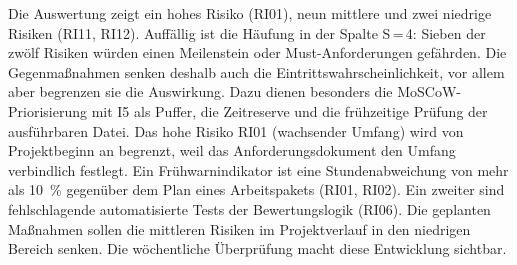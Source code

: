 Die Auswertung zeigt ein hohes Risiko (RI01), neun mittlere und zwei niedrige Risiken (RI11, RI12). Auffällig ist die Häufung in der Spalte S\,=\,4: Sieben der zwölf Risiken würden einen Meilenstein oder Must-Anforderungen gefährden. Die Gegenmaßnahmen senken deshalb auch die Eintrittswahrscheinlichkeit, vor allem aber begrenzen sie die Auswirkung. Dazu dienen besonders die \ac{MoSCoW}-Priorisierung mit I5 als Puffer, die Zeitreserve und die frühzeitige Prüfung der ausführbaren Datei. Das hohe Risiko RI01 (wachsender Umfang) wird von Projektbeginn an begrenzt, weil das Anforderungsdokument den Umfang verbindlich festlegt. Ein Frühwarnindikator ist eine Stundenabweichung von mehr als 10~\% gegenüber dem Plan eines Arbeitspakets (RI01, RI02). Ein zweiter sind fehlschlagende automatisierte Tests der Bewertungslogik (RI06). Die geplanten Maßnahmen sollen die mittleren Risiken im Projektverlauf in den niedrigen Bereich senken. Die wöchentliche Überprüfung macht diese Entwicklung sichtbar.

